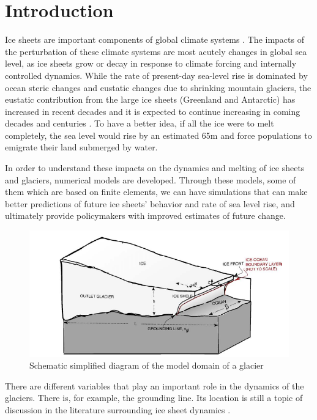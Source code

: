 \documentclass{article}
\begin{document}


\tableofcontents

\pagebreak

\section{Introduction}
\justifying
Ice sheets are important components of global climate systems \cite{zhang2017comparison}. The impacts of the perturbation of these climate systems are most acutely changes in global sea level, as ice sheets grow or decay in response to climate forcing and internally controlled dynamics. While the rate of present-day sea-level rise is dominated by ocean steric changes and eustatic changes due to shrinking mountain glaciers, the eustatic contribution from the large ice sheets (Greenland and Antarctic) has increased in recent decades and it is expected to continue increasing in coming decades and centuries \cite{clark2015recent}. To have a better idea, if all the ice were to melt completely, the sea level would rise by an estimated 65m \cite{morlighem2017bedmachine, haywood2011pliocene} and force populations to emigrate their land submerged by water.

In order to understand these impacts on the dynamics and melting of ice sheets and glaciers, numerical models are developed. Through these models, some of them which are based on finite elements, we can have simulations that can make better predictions of future ice sheets' behavior and rate of sea level rise, and ultimately provide policymakers with improved estimates of future change.

\begin{figure}[!h]
	\centering
	\includegraphics[width=0.7\linewidth]{../fig/Scheme_grounding_line.png}
	\caption{Schematic simplified diagram of the model domain of a glacier \cite{parizek2010implications}}
	\label{groundingline}
\end{figure}

There are different variables that play an important role in the dynamics of the glaciers. There is, for example, the grounding line. Its location is still a topic of discussion in the literature surrounding ice sheet dynamics \cite{goldberg2018representing}.
\end{document}

